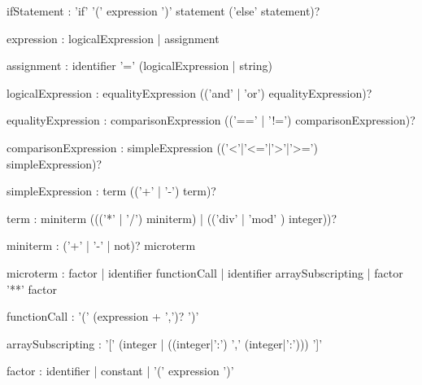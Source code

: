 \documentclass[12pt,a4paper]{article}
\begin{document}
\begin{rail}
ifStatement : 'if' '(' expression ')' statement ('else' statement)?
\end{rail}

\begin{rail}
expression : logicalExpression | assignment
\end{rail}

\begin{rail}
assignment : identifier '=' (logicalExpression | string) 
\end{rail}

\begin{rail}
logicalExpression : equalityExpression (('and' | 'or')  equalityExpression)?
\end{rail}

\begin{rail}
equalityExpression : comparisonExpression (('==' | '!=') comparisonExpression)?
\end{rail}

\begin{rail}
comparisonExpression : simpleExpression (('<'|'<='|'>'|'>=') simpleExpression)?
\end{rail}

\begin{rail}
simpleExpression : term (('+' | '-') term)?
\end{rail}

\begin{rail}
term : miniterm ((('*' | '/') miniterm) | (('div' | 'mod' ) integer))?
\end{rail}

\begin{rail}
miniterm : ('+' | '-' | not)? microterm
\end{rail}

\begin{rail}
microterm : factor | identifier functionCall | identifier arraySubscripting | factor '**' factor
\end{rail}

\begin{rail}
functionCall : '(' (expression + ',')? ')'
\end{rail}

\begin{rail}
arraySubscripting : '[' (integer | ((integer|':') ',' (integer|':'))) ']'
\end{rail}

\begin{rail}
factor : identifier | constant | '(' expression ')'
\end{rail}
\end{document}
